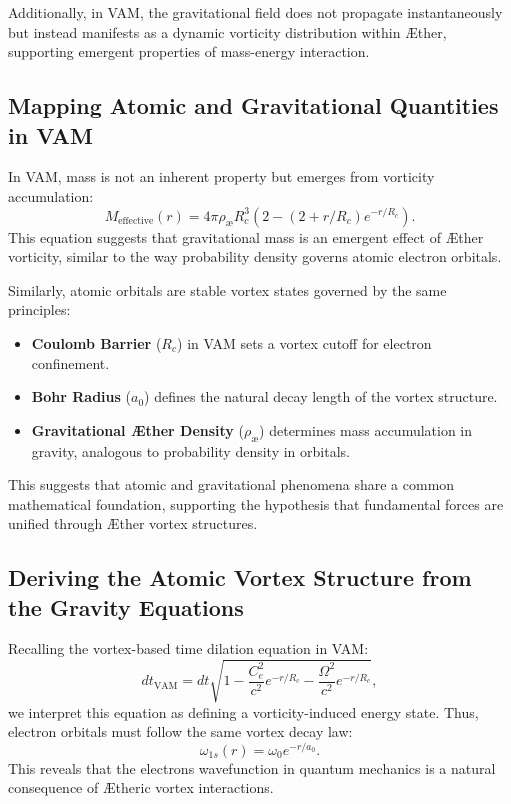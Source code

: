 Additionally, in VAM, the gravitational field does not propagate instantaneously but instead manifests as a dynamic vorticity distribution within Æther, supporting emergent properties of mass-energy interaction.


\subsection*{Mapping Atomic and Gravitational Quantities in VAM}


In VAM, mass is not an inherent property but emerges from vorticity accumulation:
\begin{equation*}
M_\text{effective}(r) = 4\pi \rho_\text{\ae} R_c^3 \left( 2 - (2 + r/R_c) e^{-r / R_c} \right).
\end{equation*}
This equation suggests that gravitational mass is an emergent effect of Æther vorticity, similar to the way probability density governs atomic electron orbitals.


Similarly, atomic orbitals are stable vortex states governed by the same principles:
\begin{itemize}
\item \textbf{Coulomb Barrier} ($R_c$) in VAM sets a vortex cutoff for electron confinement.
\item \textbf{Bohr Radius} ($a_0$) defines the natural decay length of the vortex structure.
\item \textbf{Gravitational Æther Density} ($\rho_\text{\ae}$) determines mass accumulation in gravity, analogous to probability density in orbitals.
\end{itemize}
This suggests that atomic and gravitational phenomena share a common mathematical foundation, supporting the hypothesis that fundamental forces are unified through Æther vortex structures.


\subsection*{Deriving the Atomic Vortex Structure from the Gravity Equations}


Recalling the vortex-based time dilation equation in VAM:
\begin{equation*}
dt_\text{VAM} = dt \sqrt{1 - \frac{C_e^2}{c^2} e^{-r/R_c} - \frac{\Omega^2}{c^2} e^{-r/R_c}},
\end{equation*}
we interpret this equation as defining a vorticity-induced energy state. Thus, electron orbitals must follow the same vortex decay law:
\begin{equation*}
\omega_{1s}(r) = \omega_0 e^{-r/a_0}.
\end{equation*}
This reveals that the electron\rqs s wavefunction in quantum mechanics is a natural consequence of Ætheric vortex interactions.


